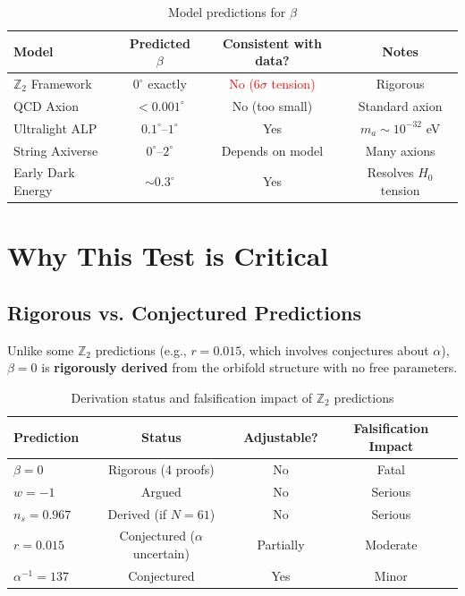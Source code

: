 \documentclass[12pt,a4paper]{article}
\begin{document}
\begin{table}[h]
\centering
\begin{tabular}{lccc}
\toprule
Model & Predicted $\beta$ & Consistent with data? & Notes \\
\midrule
$\mathbb{Z}_2$ Framework & $0^\circ$ exactly & \textcolor{red}{No ($6\sigma$ tension)} & Rigorous \\
QCD Axion & $< 0.001^\circ$ & No (too small) & Standard axion \\
Ultralight ALP & $0.1^\circ$--$1^\circ$ & Yes & $m_a \sim 10^{-32}$ eV \\
String Axiverse & $0^\circ$--$2^\circ$ & Depends on model & Many axions \\
Early Dark Energy & $\sim 0.3^\circ$ & Yes & Resolves $H_0$ tension \\
\bottomrule
\end{tabular}
\caption{Model predictions for $\beta$}
\end{table}

\section{Why This Test is Critical}

\subsection{Rigorous vs. Conjectured Predictions}

Unlike some $\mathbb{Z}_2$ predictions (e.g., $r = 0.015$, which involves conjectures about $\alpha$), $\beta = 0$ is \textbf{rigorously derived} from the orbifold structure with no free parameters.

\begin{table}[h]
\centering
\begin{tabular}{lccc}
\toprule
Prediction & Status & Adjustable? & Falsification Impact \\
\midrule
$\beta = 0$ & Rigorous (4 proofs) & No & Fatal \\
$w = -1$ & Argued & No & Serious \\
$n_s = 0.967$ & Derived (if $N = 61$) & No & Serious \\
$r = 0.015$ & Conjectured ($\alpha$ uncertain) & Partially & Moderate \\
$\alpha^{-1} = 137$ & Conjectured & Yes & Minor \\
\bottomrule
\end{tabular}
\caption{Derivation status and falsification impact of $\mathbb{Z}_2$ predictions}
\end{table}
\end{document}
